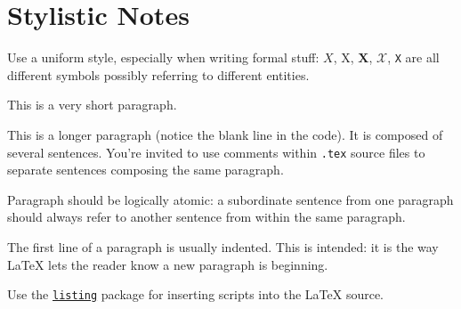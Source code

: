 \documentclass{scrartcl}
\begin{document}
    \section*{Stylistic Notes}

    Use a uniform style, especially when writing formal stuff: $X$, X, $\mathbf{X}$, $\mathcal{X}$, \texttt{X} are all different symbols possibly referring to different entities.

    This is a very short paragraph.

    This is a longer paragraph (notice the blank line in the code).
    It is composed of several sentences.
%
    You're invited to use comments within \texttt{.tex} source files to separate sentences composing the same paragraph.

    Paragraph should be logically atomic: a subordinate sentence from one paragraph should always refer to another sentence from within the same paragraph.

    The first line of a paragraph is usually indented.
%
    This is intended: it is the way \LaTeX{} lets the reader know a new paragraph is beginning.

    Use the \href{https://en.wikibooks.org/wiki/LaTeX/Source_Code_Listings}{\texttt{listing}} package for inserting scripts into the \LaTeX{} source.

    \nocite{*} %
    
    
\end{document}

